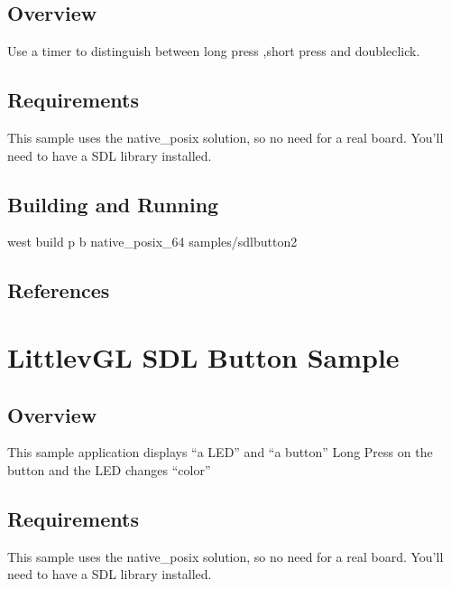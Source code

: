 \documentclass[letterpaper,10pt,english]{sphinxmanual}
\begin{document}
\subsection{Overview}
\label{\detokenize{samples/samplesbuttonsdlbutton2README:overview}}
Use a timer to distinguish between long press ,short press and double\sphinxhyphen{}click.


\subsection{Requirements}
\label{\detokenize{samples/samplesbuttonsdlbutton2README:requirements}}
This sample uses the native\_posix solution, so no need for a real board.
You’ll need to have a SDL library installed.


\subsection{Building and Running}
\label{\detokenize{samples/samplesbuttonsdlbutton2README:building-and-running}}
west build \sphinxhyphen{}p \sphinxhyphen{}b native\_posix\_64 samples/sdlbutton2


\subsection{References}
\label{\detokenize{samples/samplesbuttonsdlbutton2README:references}}

\section{LittlevGL SDL Button  Sample}
\label{\detokenize{samples/samplesbuttonsdlbuttonREADME:littlevgl-sdl-button-sample}}\label{\detokenize{samples/samplesbuttonsdlbuttonREADME:sdlb-sample}}\label{\detokenize{samples/samplesbuttonsdlbuttonREADME::doc}}

\subsection{Overview}
\label{\detokenize{samples/samplesbuttonsdlbuttonREADME:overview}}
This sample application displays “a LED” and “a button”
Long Press on the button and the LED changes “color”


\subsection{Requirements}
\label{\detokenize{samples/samplesbuttonsdlbuttonREADME:requirements}}
This sample uses the native\_posix solution, so no need for a real board.
You’ll need to have a SDL library installed.
\end{document}
